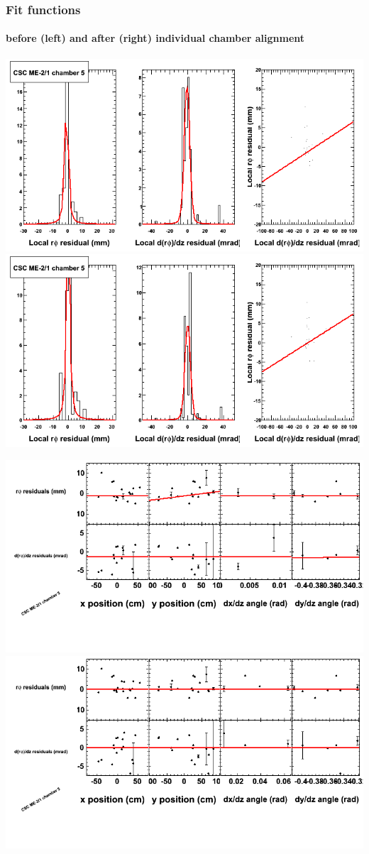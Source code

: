 \documentclass[compress]{beamer}
\begin{document}
\begin{frame}
\frametitle{Fit functions}
\framesubtitle{before (left) and after (right) individual chamber alignment}
\includegraphics[width=0.5\linewidth]{ringfits_3dof/beforefit_MEm21_05_bellcurve.png} \includegraphics[width=0.5\linewidth]{ringfits_3dof/afterfit_MEm21_05_bellcurve.png}

\includegraphics[width=0.5\linewidth]{ringfits_3dof/beforefit_MEm21_05_polynomials.png} \includegraphics[width=0.5\linewidth]{ringfits_3dof/afterfit_MEm21_05_polynomials.png}
\end{frame}
\end{document}
